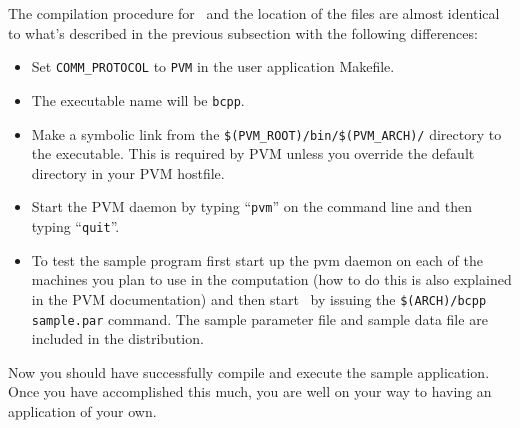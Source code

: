 The compilation procedure for \BB\ and the location of the files are almost
identical to what's described in the previous subsection with the following
differences:

\begin{itemize}
\item Set {\tt COMM\_PROTOCOL} to {\tt PVM} in the user application Makefile.
\item The executable name will be {\tt bcpp}.
\item Make a symbolic link from the
  {\tt \$(PVM\_ROOT)/bin/\$(PVM\_ARCH)/} directory 
  to the executable.
  This is required by PVM unless you override the
  default directory in your PVM hostfile.
\item Start the PVM daemon by typing ``{\tt pvm}'' on the command line
  and then typing ``{\tt quit}''.
\item To test the sample program first start up the pvm daemon on each of the
  machines you plan to use in the computation (how to do this is also
  explained in the PVM documentation) and then start \BB\ by issuing the
  {\tt \$(ARCH)/bcpp sample.par} command. The sample parameter file and 
  sample data file are included in the distribution.
\end{itemize}

Now you should have successfully compile and execute the sample application.
Once you have accomplished this much, you are well on your way to having an
application of your own. 
